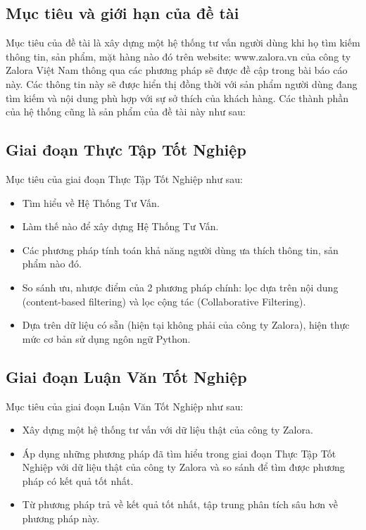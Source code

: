 \documentclass[a4paper,12pt,numbered,print,index,custombib, oneside, custommargin]{report}
\begin{document}
\subsection{Mục tiêu và giới hạn của đề tài}
Mục tiêu của đề tài là xây dựng một hệ thống tư vấn người dùng khi họ tìm kiếm thông tin, sản phẩm, mặt hàng nào đó trên website: www.zalora.vn của công ty Zalora Việt Nam thông qua các phương pháp sẽ được đề cập trong bài báo cáo này.
Các thông tin này sẽ được hiển thị đồng thời với sản phẩm người dùng đang tìm kiếm và nội dung phù hợp với sự sở thích của khách hàng. 
Các thành phần của hệ thống cũng là sản phẩm của đề tài này như sau:

\subsection{Giai đoạn Thực Tập Tốt Nghiệp}
Mục tiêu của giai đoạn Thực Tập Tốt Nghiệp như sau:
\begin{itemize}
\item Tìm hiểu về Hệ Thống Tư Vấn.
\item Làm thế nào để xây dựng Hệ Thống Tư Vấn.
\item Các phương pháp tính toán khả năng người dùng ưa thích thông tin, sản phẩm nào đó.
\item So sánh ưu, nhược điểm của 2 phương pháp chính: lọc dựa trên nội dung (content-based filtering) và lọc cộng tác (Collaborative Filtering).
\item Dựa trên dữ liệu có sẵn (hiện tại không phải của công ty Zalora), hiện thực mức cơ bản sử dụng ngôn ngữ Python.
\end{itemize}

\subsection{Giai đoạn Luận Văn Tốt Nghiệp}
Mục tiêu của giai đoạn Luận Văn Tốt Nghiệp như sau:
\begin{itemize}
\item Xây dựng một hệ thống tư vấn với dữ liệu thật của công ty Zalora.
\item Áp dụng những phương pháp đã tìm hiểu trong giai đoạn Thực Tập Tốt Nghiệp với dữ liệu thật của công ty Zalora và so sánh để tìm được phương pháp có kết quả tốt nhất.
\item Từ phương pháp trả về kết quả tốt nhất, tập trung phân tích sâu hơn về phương pháp này.

\end{itemize}
\end{document}
